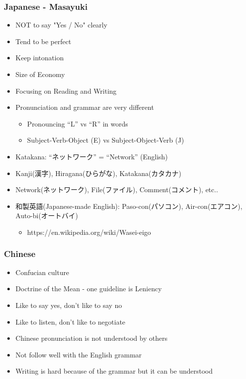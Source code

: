 \documentclass[aspectratio=169,11pt,hyperref={colorlinks=true}]{beamer}
\begin{document}
\begin{frame}
\frametitle{Japanese - Masayuki}
  \begin{itemize}
    \item NOT to say "Yes / No" clearly
    \item Tend to be perfect
    \item Keep intonation
    \item Size of Economy
    \item Focusing on Reading and Writing
    \item Pronunciation and grammar are very different
      \begin{itemize}
      \item Pronouncing “L” vs “R” in words
      \item Subject-Verb-Object (E) vs Subject-Object-Verb (J)
      \end{itemize}
    \item Katakana: “ネットワーク” = “Network” (English)
    \item Kanji(漢字), Hiragana(ひらがな), Katakana(カタカナ)
    \item Network(ネットワーク), File(ファイル), Comment(コメント), etc..
    \item 和製英語(Japanese-made English): Paso-con(パソコン), Air-con(エアコン), Auto-bi(オートバイ)
      \begin{itemize}
        \item https://en.wikipedia.org/wiki/Wasei-eigo
      \end{itemize}
  \end{itemize}
\end{frame}

\begin{frame}
\frametitle{Chinese}
  \begin{itemize}
  \item Confucian culture
  \item Doctrine of the Mean -  one guideline is Leniency
  \item Like to say yes, don't like to say no
  \item Like to listen, don't like to negotiate
  \item Chinese pronunciation is not understood by others
  \item Not follow well with the English grammar
  \item Writing is hard because of the grammar but it can be understood
  \end{itemize}
\end{frame}
\end{document}
